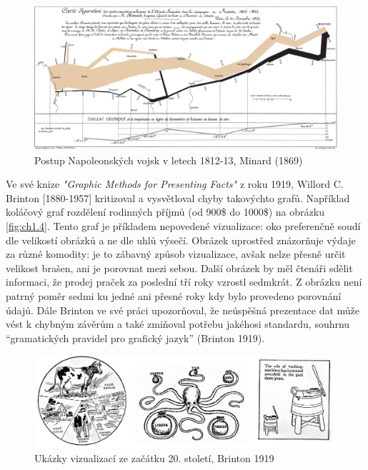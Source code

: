 \documentclass[12pt,]{article}
\begin{document}
\begin{figure}[H]
\centering
\includegraphics[width = \textwidth]{fig/Minard_1869}
\caption{Postup Napoleonských vojsk v letech 1812-13, Minard (1869)}
\label{fig:ch1.3}
\end{figure}

\qquad Ve své knize \textit{"Graphic Methods for Presenting Facts"} z
roku 1919, Willord C. Brinton {[}1880-1957{]} kritizoval a vysvětloval
chyby takovýchto grafů. Například koláčový graf rozdělení rodinných
příjmů (od 900\$ do 1000\$) na obrázku \ref{fig:ch1.4}. Tento graf je
příkladem nepovedené vizualizace: oko preferenčně soudí dle velikostí
obrázků a ne dle uhlů výsečí. Obrázek uprostřed znázorňuje výdaje za
různé komodity: je to zábavný způsob vizualizace, avšak nelze přesně
určit velikost brašen, ani je porovnat mezi sebou. Další obrázek by měl
čtenáři sdělit informaci, že prodej praček za poslední tří roky vzrostl
sedmkrát. Z obrázku není patrný poměr sedmi ku jedné ani přesné roky kdy
bylo provedeno porovnání údajů. Dále Brinton ve své práci upozorňoval,
že neúspěšná prezentace dat může vést k chybným závěrům a také zmiňoval
potřebu jakéhosi standardu, souhrnu \enquote{gramatických pravidel pro
grafický jazyk} (Brinton 1919).

\begin{figure}[H]

{\centering \includegraphics[width=1\linewidth]{fig/brinton} 

}

\caption{\label{fig:ch1.4} Ukázky vizualizací ze začátku 20. století, Brinton 1919}\label{fig:brinton}
\end{figure}
\end{document}
